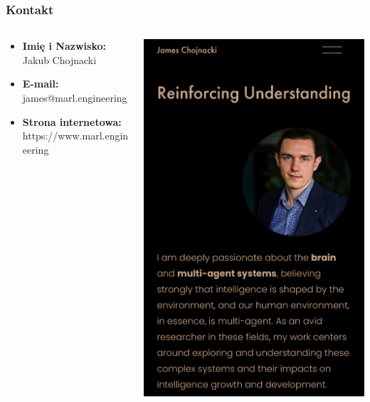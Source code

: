 \documentclass[smaller]{beamer}
\begin{document}

\begin{frame}
\frametitle{Kontakt}

\begin{columns}
    \begin{column}{0.6\textwidth}
        \begin{itemize}
            \item \textbf{Imię i Nazwisko:} Jakub Chojnacki
            \item \textbf{E-mail:} james@marl.engineering
            \item \textbf{Strona internetowa:} https://www.marl.engineering
        \end{itemize}
    \end{column}

    \begin{column}{0.4\textwidth}
        \includegraphics[width=\textwidth]{../manifest/marl-engineering.jpg}
    \end{column}
\end{columns}
\end{frame}
\end{document}
